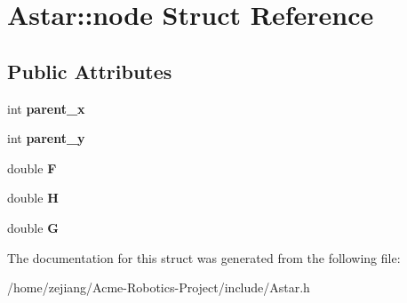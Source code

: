 \hypertarget{structAstar_1_1node}{\section{Astar\-:\-:node Struct Reference}
\label{structAstar_1_1node}
}
\subsection*{Public Attributes}
\begin{DoxyCompactItemize}
\item 
\hypertarget{structAstar_1_1node_a171ad5aa886b859fc0103dae466e38eb}{int {\bfseries parent\-\_\-x}}\label{structAstar_1_1node_a171ad5aa886b859fc0103dae466e38eb}

\item 
\hypertarget{structAstar_1_1node_a89a62ffd7014525b6cbbf6fe98f88d47}{int {\bfseries parent\-\_\-y}}\label{structAstar_1_1node_a89a62ffd7014525b6cbbf6fe98f88d47}

\item 
\hypertarget{structAstar_1_1node_af030469fe3c3cef6df69a9f2e2632c21}{double {\bfseries F}}\label{structAstar_1_1node_af030469fe3c3cef6df69a9f2e2632c21}

\item 
\hypertarget{structAstar_1_1node_a6bf6c47fdc529c05bd496b1e1640679e}{double {\bfseries H}}\label{structAstar_1_1node_a6bf6c47fdc529c05bd496b1e1640679e}

\item 
\hypertarget{structAstar_1_1node_a74eb145e28f56e540e511b9431543d97}{double {\bfseries G}}\label{structAstar_1_1node_a74eb145e28f56e540e511b9431543d97}

\end{DoxyCompactItemize}


The documentation for this struct was generated from the following file\-:\begin{DoxyCompactItemize}
\item 
/home/zejiang/\-Acme-\/\-Robotics-\/\-Project/include/Astar.\-h\end{DoxyCompactItemize}
